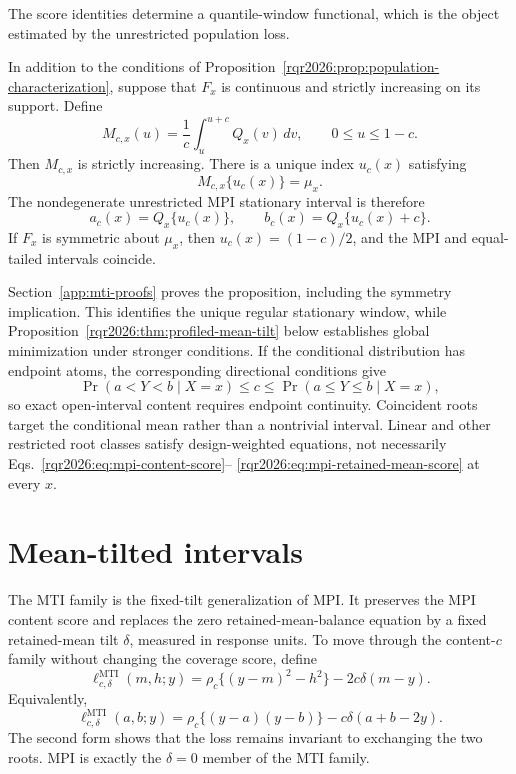 The score identities determine a quantile-window functional, which is the
object estimated by the unrestricted population loss.

\begin{proposition}
\label{rqr2026:thm:quantile-window}
In addition to the conditions of
Proposition~\ref{rqr2026:prop:population-characterization}, suppose that \(F_x\) is
continuous and strictly increasing on its support.
Define
\[
M_{c,x}(u)=\frac{1}{c}\int_u^{u+c}Q_x(v)\,dv,
\qquad 0\le u\le1-c.
\]
Then \(M_{c,x}\) is strictly increasing. There is a unique index \(u_c(x)\)
satisfying
\[
M_{c,x}\{u_c(x)\}=\mu_x.
\]
The nondegenerate unrestricted MPI stationary interval is therefore
\[
a_c(x)=Q_x\{u_c(x)\},\qquad
b_c(x)=Q_x\{u_c(x)+c\}.
\]
If \(F_x\) is symmetric about \(\mu_x\), then
\(u_c(x)=(1-c)/2\), and the MPI and equal-tailed intervals coincide.
\end{proposition}

Section~\ref{app:mti-proofs} proves the proposition, including the symmetry
implication. This identifies the unique regular stationary window, while
Proposition~\ref{rqr2026:thm:profiled-mean-tilt} below establishes global
minimization under stronger conditions. If the conditional distribution has endpoint atoms,
the corresponding directional conditions give
\[
\Pr(a<Y<b\mid X=x)\le c\le\Pr(a\le Y\le b\mid X=x),
\]
so exact open-interval content requires endpoint continuity. Coincident roots
target the conditional mean rather than a nontrivial interval. Linear and other
restricted root classes satisfy design-weighted equations, not necessarily
Eqs.~\eqref{rqr2026:eq:mpi-content-score}--%
\eqref{rqr2026:eq:mpi-retained-mean-score} at every \(x\).

\section{Mean-tilted intervals}
\label{rqr2026:sec:mti-loss}

The MTI family is the fixed-tilt generalization of MPI. It preserves the MPI
content score and replaces the zero retained-mean-balance equation by a fixed
retained-mean tilt \(\delta\), measured in response units. To move through the
content-\(c\) family without changing the coverage score, define
\[
\ell_{c,\delta}^{\mathrm{MTI}}(m,h;y)
=
\rho_c\{(y-m)^2-h^2\}-2c\delta(m-y).
\]
Equivalently,
\[
\ell_{c,\delta}^{\mathrm{MTI}}(a,b;y)
=
\rho_c\{(y-a)(y-b)\}-c\delta(a+b-2y).
\]
The second form shows that the loss remains invariant to exchanging the two
roots. MPI is exactly the \(\delta=0\) member of the MTI family.

